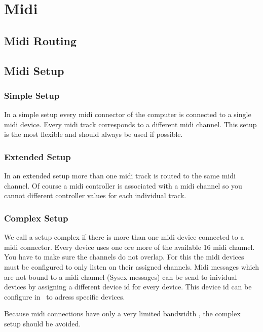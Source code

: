 \chapter{Midi}
  \section{Midi Routing}
  \section{Midi Setup}
  \subsection{Simple Setup}

      In a simple setup every midi connector of the computer is connected
      to a single midi device. Every midi track corresponds to a
      different midi channel.
      This setup is the most flexible and should always be used if
      possible.

  \subsection{Extended Setup}

      In an extended setup more than one midi track is routed to the
      same midi channel. Of course a midi controller is associated with
      a midi channel so you cannot different controller values for
      each individual track.

  \subsection{Complex Setup}
      We call a setup complex if there is more than one midi device
      connected to a midi connector.
      Every device uses one ore more of the available 16 midi channel.
      You have to make sure the channels do not overlap. For this
      the midi devices must be configured to only listen on their 
      assigned channels.
      Midi messages which are not bound to a midi channel (Sysex
      messages) can be send to inividual devices by assigning a
      different device id for every device. This device id can be
      configure in \M\ to adress specific devices.

      Because midi connections have only a very limited 
      bandwidth , the complex setup should be
      avoided.
      
